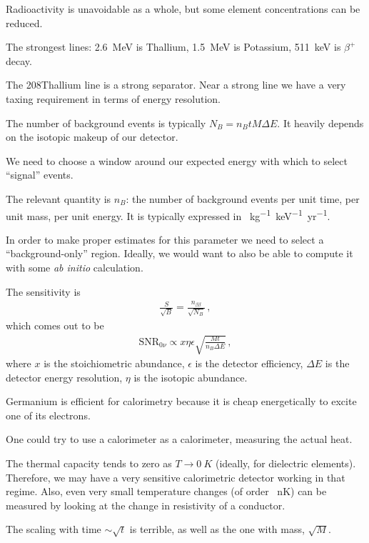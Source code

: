 \documentclass[main.tex]{subfiles}
\begin{document}

Radioactivity is unavoidable as a whole, but some element concentrations 
can be reduced. 

The strongest lines: \SI{2.6}{MeV} is Thallium, \SI{1.5}{MeV} is Potassium,
\SI{511}{keV} is \(\beta^{+}\) decay. 

The 208Thallium line is a strong separator. 
Near a strong line we have a very taxing requirement in terms of energy resolution. 

The number of background events is typically \(N_B = n_B t M \Delta E\). 
It heavily depends on the isotopic makeup of our detector. 

We need to choose a window around our expected energy with which to select ``signal'' events. 

The relevant quantity is \(n_B\): the number of background events per unit time, per unit mass, per unit energy. It is typically expressed in \SI{}{kg^{-1} keV^{-1} yr^{-1}}. 

In order to make proper estimates for this parameter we need to select a ``background-only'' region. 
Ideally, we would want to also be able to compute it with some \emph{ab initio} calculation. 

The sensitivity is 
%
\begin{align}
\frac{S}{\sqrt{B}} = \frac{n_{\beta \beta }}{\sqrt{N_B}}
\,,
\end{align}
%
which comes out to be 
%
\begin{align}
\text{SNR}_{0 \nu } \propto x \eta \epsilon \sqrt{ \frac{Mt}{n_B \Delta E}}
\,,
\end{align}
%
where \(x\) is the stoichiometric abundance, \(\epsilon\) is the detector efficiency, \(\Delta E\) is the detector energy resolution, \(\eta \) is the isotopic abundance. 

Germanium is efficient for calorimetry because it is cheap energetically to excite one of its electrons. 

One could try to use a calorimeter as a calorimeter, measuring the actual heat. 

The thermal capacity tends to zero as \(T \to \SI{0}{K}\) (ideally, for dielectric elements). 
Therefore, we may have a very sensitive calorimetric detector working in that regime. 
Also, even very small temperature changes (of order \SI{}{nK}) can be measured by looking at the change in resistivity of a conductor.

The scaling with time \(\sim\sqrt{t}\) is terrible, as well as the one with mass, \(\sqrt{M}\). 
\end{document}
